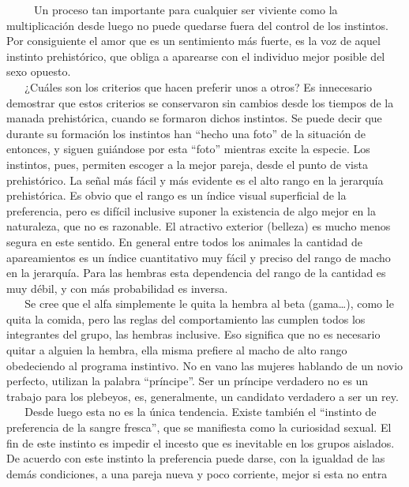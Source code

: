 ~ ~ ~ Un proceso tan importante para cualquier ser viviente como la
multiplicación desde luego no puede quedarse fuera del control de los
instintos. Por consiguiente el amor que es un sentimiento más fuerte, es
la voz de aquel instinto prehistórico, que obliga a aparearse con el
individuo mejor posible del sexo opuesto.\\
\hspace*{0.333em} ~ ~ ¿Cuáles son los criterios que hacen preferir unos
a otros? Es innecesario demostrar que estos criterios se conservaron sin
cambios desde los tiempos de la manada prehistórica, cuando se formaron
dichos instintos. Se puede decir que durante su formación los instintos
han ``hecho una foto'' de la situación de entonces, y siguen guiándose
por esta ``foto'' mientras excite la especie. Los instintos, pues,
permiten escoger a la mejor pareja, desde el punto de vista
prehistórico. La señal más fácil y más evidente es el alto rango en la
jerarquía prehistórica. Es obvio que el rango es un índice visual
superficial de la preferencia, pero es difícil inclusive suponer la
existencia de algo mejor en la naturaleza, que no es razonable. El
atractivo exterior (belleza) es mucho menos segura en este sentido. En
general entre todos los animales la cantidad de apareamientos es un
índice cuantitativo muy fácil y preciso del rango de macho en la
jerarquía. Para las hembras esta dependencia del rango de la cantidad es
muy débil, y con más probabilidad es inversa.\\
\hspace*{0.333em} ~ ~ Se cree que el alfa simplemente le quita la hembra
al beta (gama\ldots{}), como le quita la comida, pero las reglas del
comportamiento las cumplen todos los integrantes del grupo, las hembras
inclusive. Eso significa que no es necesario quitar a alguien la hembra,
ella misma prefiere al macho de alto rango obedeciendo al programa
instintivo. No en vano las mujeres hablando de un novio perfecto,
utilizan la palabra ``príncipe''. Ser un príncipe verdadero no es un
trabajo para los plebeyos, es, generalmente, un candidato verdadero a
ser un rey.\\
\hspace*{0.333em} ~ ~ Desde luego esta no es la única tendencia. Existe
también el ``instinto de preferencia de la sangre fresca'', que se
manifiesta como la curiosidad sexual. El fin de este instinto es impedir
el incesto que es inevitable en los grupos aislados. De acuerdo con este
instinto la preferencia puede darse, con la igualdad de las demás
condiciones, a una pareja nueva y poco corriente, mejor si esta no entra
